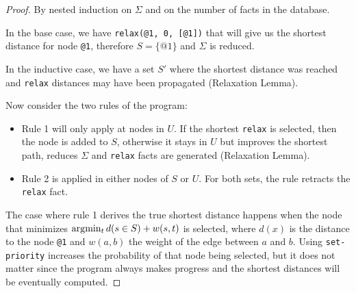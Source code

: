 \begin{proof}
   By nested induction on $\Sigma$ and on the number of facts in the database.

   In the base case, we have \texttt{relax(@1, 0, [@1])} that will give us
   the shortest distance for node \texttt{@1}, therefore $S = \{@1\}$ and
   $\Sigma$ is reduced.

   In the inductive case, we have a set $S'$ where the shortest distance was
   reached and \texttt{relax} distances may have been propagated (Relaxation
   Lemma).

   Now consider the two rules of the program:

   \begin{itemize}

      \item Rule 1 will only apply at nodes in $U$. If the shortest
         \texttt{relax} is selected, then the node is added to $S$, otherwise it
         stays in $U$ but improves the shortest path, reduces $\Sigma$ and
         \texttt{relax} facts are generated (Relaxation Lemma).

      \item Rule 2 is applied in either nodes of $S$ or $U$. For both sets, the rule
         retracts the \texttt{relax} fact.

   \end{itemize}

   The case where rule 1 derives the true shortest distance happens when the
   node that minimizes $\arg\!\min_t d(s \in S) + w(s, t)$ is selected, where
   $d(x)$ is the distance to the node \texttt{@1} and $w(a, b)$ the weight of
   the edge between $a$ and $b$. Using \texttt{set-priority} increases the
   probability of that node being selected, but it does not matter since
   the program always makes progress and the shortest distances will be
   eventually computed.
\end{proof}
